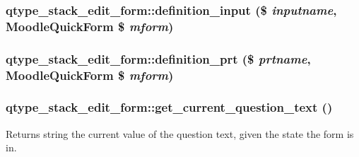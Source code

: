 \hypertarget{classqtype__stack__edit__form_a7f88936bea5c6ddfb0407ca5d9964166}{
\subsubsection[{definition\_\-input}]{\setlength{\rightskip}{0pt plus 5cm}qtype\_\-stack\_\-edit\_\-form::definition\_\-input (\$ {\em inputname}, \/  MoodleQuickForm \$ {\em mform})}}
\label{classqtype__stack__edit__form_a7f88936bea5c6ddfb0407ca5d9964166}
\hypertarget{classqtype__stack__edit__form_a24da883b98d3ee453a7a1aac5713f464}{
\subsubsection[{definition\_\-prt}]{\setlength{\rightskip}{0pt plus 5cm}qtype\_\-stack\_\-edit\_\-form::definition\_\-prt (\$ {\em prtname}, \/  MoodleQuickForm \$ {\em mform})}}
\label{classqtype__stack__edit__form_a24da883b98d3ee453a7a1aac5713f464}
\hypertarget{classqtype__stack__edit__form_a24a46bd5f95473cd7a5d4b2d2d3108f9}{
\subsubsection[{get\_\-current\_\-question\_\-text}]{\setlength{\rightskip}{0pt plus 5cm}qtype\_\-stack\_\-edit\_\-form::get\_\-current\_\-question\_\-text ()}}
\label{classqtype__stack__edit__form_a24a46bd5f95473cd7a5d4b2d2d3108f9}
\begin{DoxyReturn}{Returns}
string the current value of the question text, given the state the form is in. 
\end{DoxyReturn}
